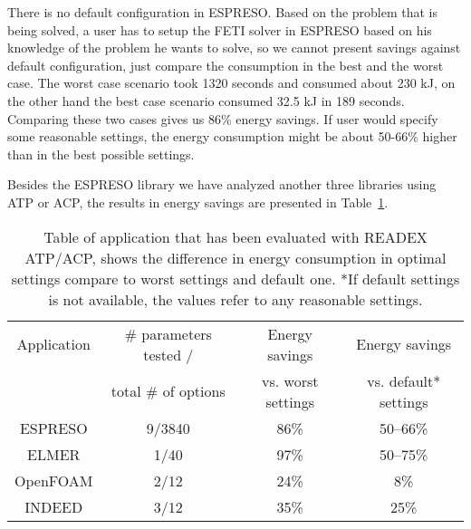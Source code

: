 There is no default configuration in ESPRESO. Based on the problem that is being solved, a user has to setup the FETI solver in ESPRESO based on his knowledge of the problem he wants to solve, so we cannot present savings against default configuration, just compare the consumption in the best and the worst case. The worst case scenario took 1320 seconds and consumed about 230 kJ, on the other hand the best case scenario consumed 32.5 kJ in 189 seconds. Comparing these two cases gives us 86\% energy savings. If user would specify some reasonable settings, the energy consumption might be about 50-66\% higher than in the best possible settings.

Besides the ESPRESO library we have analyzed another three libraries using ATP or ACP, the results in energy savings are presented in Table~\ref{tab:ATPACP}.

\begin{table}[h]
    \centering

    \begin{tabular}{|c|c|c|c|}
    \hline
Application & \# parameters tested /& Energy savings     & Energy savings \\
            & total \# of options      & vs. worst settings & vs. default* settings\\
\hline
ESPRESO     & 9/3840 & 86\% & 50--66\% \\ \hline
ELMER       & 1/40   & 97\% & 50--75\% \\ \hline
OpenFOAM    & 2/12   & 24\% &      8\% \\ \hline
INDEED      & 3/12   & 35\% &     25\% \\ \hline

    \end{tabular}
    \caption{Table of application that has been evaluated with READEX ATP/ACP, shows the difference in energy consumption in optimal settings compare to worst settings and default one. *If default settings is not available, the values refer to any reasonable settings.}
    \label{tab:ATPACP}
\end{table}
